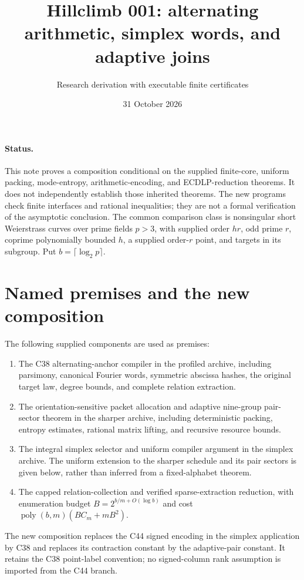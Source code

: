 \documentclass[11pt]{article}
\title{Hillclimb 001: alternating arithmetic, simplex words, and adaptive joins}
\author{Research derivation with executable finite certificates}
\date{31 October 2026}
\begin{document}
\maketitle

\paragraph{Status.}
This note proves a composition conditional on the supplied finite-core,
uniform packing, mode-entropy, arithmetic-encoding, and ECDLP-reduction
theorems. It does not independently establish those inherited theorems.
The new programs check finite interfaces and rational inequalities;
they are not a formal verification of the asymptotic conclusion.
The common comparison class is nonsingular short Weierstrass curves over
prime fields $p>3$, with supplied order $hr$, odd prime $r$, coprime
polynomially bounded $h$, a supplied order-$r$ point, and targets in its
subgroup. Put $b=\lceil\log_2p\rceil$.

\section{Named premises and the new composition}
The following supplied components are used as premises:
\begin{enumerate}
\item The C38 alternating-anchor compiler in the profiled archive,
including parsimony, canonical Fourier words, symmetric abscissa hashes,
the original target law, degree bounds, and complete relation extraction.
\item The orientation-sensitive packet allocation and adaptive
nine-group pair-sector theorem in the sharper archive, including
deterministic packing, entropy estimates, rational matrix lifting,
and recursive resource bounds.
\item The integral simplex selector and uniform compiler argument in
the simplex archive. The uniform extension to the sharper schedule
and its pair sectors is given below, rather than inferred from a
fixed-alphabet theorem.
\item The capped relation-collection and verified sparse-extraction
reduction, with enumeration budget $B=2^{b/m+O(\log b)}$ and cost
$\operatorname{poly}(b,m)(BC_m+mB^2)$.
\end{enumerate}
The new composition replaces the C44 signed encoding in the simplex
application by C38 and replaces its contraction constant by the
adaptive-pair constant. It retains the C38 point-label convention;
no signed-column rank assumption is imported from the C44 branch.
\end{document}

